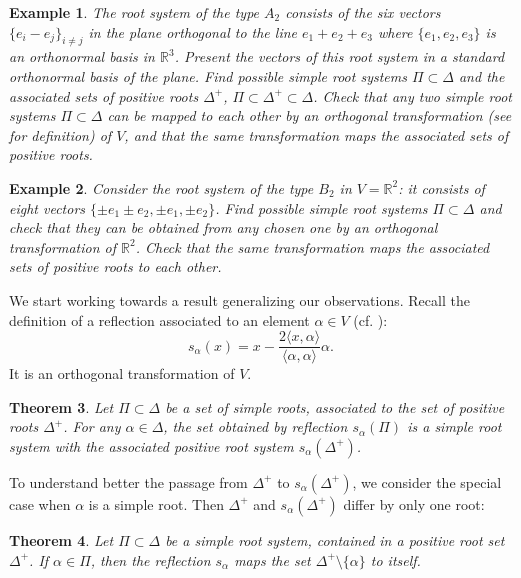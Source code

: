 \documentclass[11pt]{amsart}
\newcommand{\R}{\mathbb R}
\newtheorem{theorem}{Theorem}
\newtheorem{example}[theorem]{Example}
\begin{document}
\begin{example} \label{A2}
 The root system of the type $A_2$ consists of the six vectors 
$\{e_i -e_j \}_{i\neq j}$ in the plane orthogonal to the line $e_1 +e_2 +e_3$ 
where $\{e_1, e_2, e_3\}$ is an orthonormal basis in $\R^3$.
Present the vectors of this root system in a standard orthonormal basis of 
the plane. Find possible simple root systems $\Pi \subset \Delta$ and 
the associated sets of positive roots $\Delta^+$, 
$\Pi \subset \Delta^+ \subset \Delta$.  
Check that any two simple root systems 
$\Pi \subset \Delta$ can be mapped to each other  by an orthogonal 
transformation (see \cite{1} for definition) of $V$, and that the same 
transformation maps the associated sets of positive roots.    
\end{example}   

\begin{example} \label{B2} 
Consider the root system of the type $B_2$ in $V= \R^2$: it consists of eight 
vectors $\{\pm e_1 \pm e_2, \pm e_1, \pm e_2 \}$. Find possible simple 
root systems $\Pi \subset \Delta$ and check that they can be obtained from 
any chosen one by an orthogonal transformation of $\R^2$. Check that 
the same transformation maps the associated sets of positive roots to each 
other. 
\end{example} 

We start working towards a result generalizing our observations. 
Recall the definition of a reflection associated to an element $\alpha \in V$ 
(cf. \cite{1}):
$$ s_\alpha(x) = x - \frac{2\langle x, \alpha \rangle}{\langle \alpha, \alpha 
\rangle}\alpha .$$ 
It is an orthogonal transformation of $V$. 

\begin{theorem} Let $\Pi \subset \Delta$ be a set of simple roots, associated 
to the set of positive roots $\Delta^+$. For any $\alpha \in \Delta$, 
the set obtained by reflection $s_\alpha(\Pi)$ is a simple root system   
with the associated positive root system $s_\alpha (\Delta^+)$. 
\end{theorem} 

To understand better the passage from $\Delta^+$ to $s_\alpha(\Delta^+)$, 
we consider the special case when $\alpha$ is a simple root. Then 
$\Delta^+$ and $s_\alpha(\Delta^+)$ differ by only one root: 

\begin{theorem} \label{sa}
Let $\Pi \subset \Delta$ be a simple root system, 
contained in a positive root set $\Delta^+$. If $\alpha \in \Pi$, then 
the reflection $s_\alpha$ maps the set $\Delta^+ \setminus \{\alpha\}$ to 
itself.     
\end{theorem} 
\end{document}
